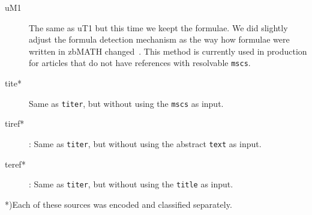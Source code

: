 \begin{description}
  \item[uM1] The same as uT1 but this time we keept the formulae. We did slightly adjust the formula detection mechanism as the way how formulae were written in zbMATH changed~\cite{Schubotz2019b}. This method is currently used in production for articles that do not have references with resolvable \texttt{mscs}.
  \item[tite*] Same as \texttt{titer}, but without using the \texttt{mscs} as input.
  \item[tiref*]: Same as \texttt{titer}, but without using the abstract \texttt{text} as input.
  \item[teref*]: Same as \texttt{titer}, but without using the \texttt{title} as input.
\end{description}

*)Each of these sources was encoded and classified separately.
